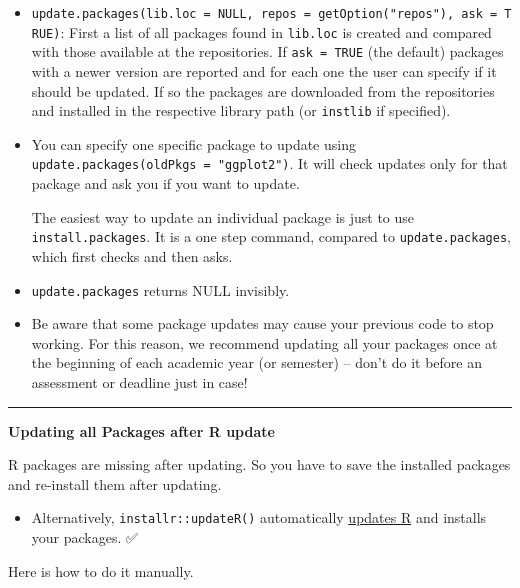 \documentclass[
]{book}
\providecommand{\tightlist}{%
  \setlength{\itemsep}{0pt}\setlength{\parskip}{0pt}}
\theoremstyle{definition}
\theoremstyle{definition}
\theoremstyle{definition}
\theoremstyle{definition}
\theoremstyle{remark}
\begin{document}
\begin{itemize}
\item
  \texttt{update.packages(lib.loc\ =\ NULL,\ repos\ =\ getOption("repos"),\ ask\ =\ TRUE)}: First a list of all packages found in \texttt{lib.loc} is created and compared with those available at the repositories. If \texttt{ask\ =\ TRUE} (the default) packages with a newer version are reported and for each one the user can specify if it should be updated. If so the packages are downloaded from the repositories and installed in the respective library path (or \texttt{instlib} if specified).
\item
  You can specify one specific package to update using \texttt{update.packages(oldPkgs\ =\ "ggplot2")}. It will check updates only for that package and ask you if you want to update.

  The easiest way to update an individual package is just to use \texttt{install.packages}. It is a one step command, compared to \texttt{update.packages}, which first checks and then asks.
\item
  \texttt{update.packages} returns NULL invisibly.
\item
  Be aware that some package updates may cause your previous code to stop working. For this reason, we recommend updating all your packages once at the beginning of each academic year (or semester) -- don't do it before an assessment or deadline just in case!
\end{itemize}

\begin{center}\rule{0.5\linewidth}{0.5pt}\end{center}

\textbf{Updating all Packages after {R update}}

R packages are missing after updating. So you have to save the installed packages and re-install them after updating.

\begin{itemize}
\tightlist
\item
  Alternatively, \texttt{installr::updateR()} automatically \hyperref[update-r]{updates R} and installs your packages. ✅
\end{itemize}

Here is how to do it manually.
\end{document}

